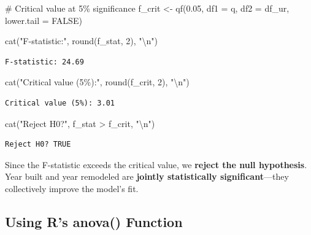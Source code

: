 \documentclass[
  letterpaper,
  DIV=11,
  numbers=noendperiod]{scrreprt}
\newenvironment{Shaded}{\begin{snugshade}}{\end{snugshade}}
\newcommand{\AttributeTok}[1]{\textcolor[rgb]{0.40,0.45,0.13}{#1}}
\newcommand{\CommentTok}[1]{\textcolor[rgb]{0.37,0.37,0.37}{#1}}
\newcommand{\ConstantTok}[1]{\textcolor[rgb]{0.56,0.35,0.01}{#1}}
\newcommand{\DecValTok}[1]{\textcolor[rgb]{0.68,0.00,0.00}{#1}}
\newcommand{\FloatTok}[1]{\textcolor[rgb]{0.68,0.00,0.00}{#1}}
\newcommand{\FunctionTok}[1]{\textcolor[rgb]{0.28,0.35,0.67}{#1}}
\newcommand{\NormalTok}[1]{\textcolor[rgb]{0.00,0.23,0.31}{#1}}
\newcommand{\OtherTok}[1]{\textcolor[rgb]{0.00,0.23,0.31}{#1}}
\newcommand{\SpecialCharTok}[1]{\textcolor[rgb]{0.37,0.37,0.37}{#1}}
\newcommand{\StringTok}[1]{\textcolor[rgb]{0.13,0.47,0.30}{#1}}
\begin{document}
\begin{Shaded}
\begin{Highlighting}[]
\CommentTok{\# Critical value at 5\% significance}
\NormalTok{f\_crit }\OtherTok{\textless{}{-}} \FunctionTok{qf}\NormalTok{(}\FloatTok{0.05}\NormalTok{, }\AttributeTok{df1 =}\NormalTok{ q, }\AttributeTok{df2 =}\NormalTok{ df\_ur, }\AttributeTok{lower.tail =} \ConstantTok{FALSE}\NormalTok{)}

\FunctionTok{cat}\NormalTok{(}\StringTok{"F{-}statistic:"}\NormalTok{, }\FunctionTok{round}\NormalTok{(f\_stat, }\DecValTok{2}\NormalTok{), }\StringTok{"}\SpecialCharTok{\textbackslash{}n}\StringTok{"}\NormalTok{)}
\end{Highlighting}
\end{Shaded}

\begin{verbatim}
F-statistic: 24.69 
\end{verbatim}

\begin{Shaded}
\begin{Highlighting}[]
\FunctionTok{cat}\NormalTok{(}\StringTok{"Critical value (5\%):"}\NormalTok{, }\FunctionTok{round}\NormalTok{(f\_crit, }\DecValTok{2}\NormalTok{), }\StringTok{"}\SpecialCharTok{\textbackslash{}n}\StringTok{"}\NormalTok{)}
\end{Highlighting}
\end{Shaded}

\begin{verbatim}
Critical value (5%): 3.01 
\end{verbatim}

\begin{Shaded}
\begin{Highlighting}[]
\FunctionTok{cat}\NormalTok{(}\StringTok{"Reject H0?"}\NormalTok{, f\_stat }\SpecialCharTok{\textgreater{}}\NormalTok{ f\_crit, }\StringTok{"}\SpecialCharTok{\textbackslash{}n}\StringTok{"}\NormalTok{)}
\end{Highlighting}
\end{Shaded}

\begin{verbatim}
Reject H0? TRUE 
\end{verbatim}

Since the F-statistic exceeds the critical value, we \textbf{reject the
null hypothesis}. Year built and year remodeled are \textbf{jointly
statistically significant}---they collectively improve the model's fit.

\subsection{Using R's anova() Function}\label{using-rs-anova-function}
\end{document}
